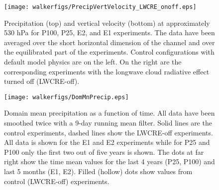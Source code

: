 \documentclass[draft]{agujournal2019}
\begin{document}

\begin{figure}
  \centering
      \texttt{[image: walkerfigs/PrecipVertVelocity\_LWCRE\_onoff.eps]}
  \caption{Precipitation (top) and vertical velocity (bottom) at approximately 530 hPa for P100, P25, E2, and E1 experiments.  
  The data have been averaged over the short horizontal dimension of the channel and over the 
  equilibrated part of the experiments.  Control configurations with default model physics are on the 
  left.  On the right are the corresponding experiments with the longwave cloud radiative effect turned
  off (LWCRE-off).}
  \label{fig:precip_vertvel}
\end{figure}
%
%
%

\begin{figure}
  \centering
      \texttt{[image: walkerfigs/DomMnPrecip.eps]}
  \caption{Domain mean precipitation as a function of time.  All data have been smoothed twice with a 9-day running mean filter.  
  Solid lines are the control experiments, dashed lines show the LWCRE-off experiments.  All data is shown for the E1 and E2 experiments
  while for P25 and P100 only the first two out of five years is shown.  The dots at far right show the time mean values for the last 4 years (P25, P100) and last 5 months (E1, E2).  Filled (hollow) dots show values from control (LWCRE-off) experiments. }
    \label{fig:precip_dom_mn}
\end{figure}
\end{document}
